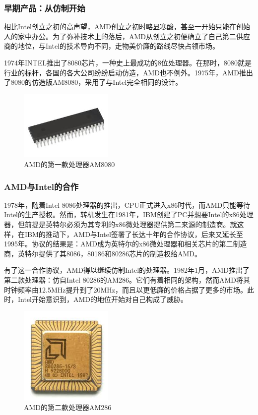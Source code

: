 \documentclass[UTF8]{ctexart}
\begin{document}
\subsubsection{早期产品：从仿制开始}
相比Intel创立之初的高声望，AMD创立之初时略显寒酸，甚至一开始只能在创始人的家中办公。为了弥补技术上的落后，AMD从创立之初便确立了自己第二供应商的地位，与Intel的技术导向不同，走物美价廉的路线尽快占领市场。

1974年INTEL推出了8080芯片，一种史上最成功的8位处理器。在那时，8080就是行业的标杆，各国的各大公司纷纷启动仿造，AMD也不例外。1975年，AMD推出了8080的仿造版AM8080，采用了与Intel完全相同的设计。
\begin{figure}[H]
    \begin{center}
        \includegraphics[width=0.4\textwidth]{figure/AM8080.jpg}
        \caption{AMD的第一款处理器AM8080}
    \end{center}
\end{figure}

\subsubsection{AMD与Intel的合作}
1978年，随着Intel 8086处理器的推出，CPU正式进入x86时代，而AMD只能等待Intel的生产授权。然而，转机发生在1981年，IBM创建了PC并想要Intel的x86处理器，但前提是英特尔必须为其专利的x86微处理器提供第二来源的制造商。就这样，在IBM的推动下，AMD与Intel签署了长达十年的合作协议，后来又延长至1995年。协议的结果是：AMD成为英特尔的x86微处理器和相关芯片的第二制造商，英特尔提供了其8086，80186和80286芯片的制造权给AMD。

有了这一合作协议，AMD得以继续仿制Intel的处理器。1982年1月，AMD推出了第二款处理器：仿自Intel 80286的AM286。它们有着相同的架构，然而AMD将其时钟频率由12.5MHz提升到了20MHz，而且以更低廉的价格占据了更多的市场。此时，Intel开始意识到，AMD的地位开始对自己构成了威胁。

\begin{figure}[H]
    \begin{center}
        \includegraphics[width=0.4\textwidth]{figure/AM286.jpg}
        \caption{AMD的第二款处理器AM286}
    \end{center}
\end{figure}
\end{document}
